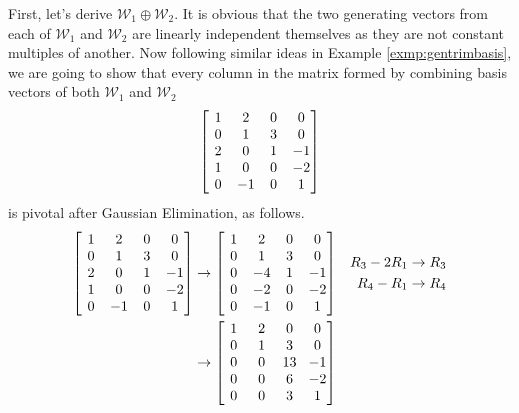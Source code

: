 \begin{solution}
First, let's derive $\mathcal{W}_1 \oplus \mathcal{W}_2$. It is obvious that the two generating vectors from each of $\mathcal{W}_1$ and $\mathcal{W}_2$ are linearly independent themselves as they are not constant multiples of another. Now following  similar ideas in Example \ref{exmp:gentrimbasis}, we are going to show that every column in the matrix formed by combining basis vectors of both $\mathcal{W}_1$ and $\mathcal{W}_2$
\begin{align*}
\left[\begin{array}{@{\,}wc{10pt}wc{10pt}wc{10pt}wc{10pt}@{\,}}
1 & 2 & 0 & 0\\
0 & 1 & 3 & 0\\
2 & 0 & 1 & -1\\
1 & 0 & 0 & -2\\
0 & -1 & 0 & 1
\end{array}\right]    
\end{align*}
is pivotal after Gaussian Elimination, as follows.
\begin{align*}
\left[\begin{array}{@{\,}wc{10pt}wc{10pt}wc{10pt}wc{10pt}@{\,}}
1 & 2 & 0 & 0\\
0 & 1 & 3 & 0\\
2 & 0 & 1 & -1\\
1 & 0 & 0 & -2\\
0 & -1 & 0 & 1
\end{array}\right]  
&\rightarrow
\left[\begin{array}{@{\,}wc{10pt}wc{10pt}wc{10pt}wc{10pt}@{\,}}
1 & 2 & 0 & 0\\
0 & 1 & 3 & 0\\
0 & -4 & 1 & -1\\
0 & -2 & 0 & -2\\
0 & -1 & 0 & 1
\end{array}\right] 
&
\begin{aligned}
R_3 - 2R_1 &\to R_3 \\
R_4 - R_1 &\to R_4
\end{aligned} \\
&\rightarrow
\left[\begin{array}{@{\,}wc{10pt}wc{10pt}wc{10pt}wc{10pt}@{\,}}
1 & 2 & 0 & 0\\
0 & 1 & 3 & 0\\
0 & 0 & 13 & -1\\
0 & 0 & 6 & -2\\
0 & 0 & 3 & 1
\end{array}\right] 
&
\begin{aligned}

\end{aligned}
\end{align*}
\end{solution}

